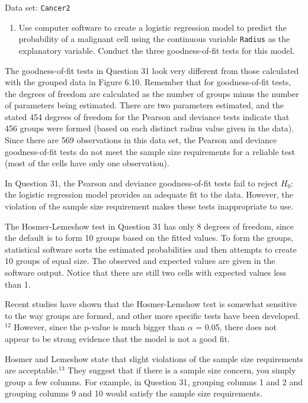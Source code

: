 \documentclass[
]{report}
\providecommand{\tightlist}{%
  \setlength{\itemsep}{0pt}\setlength{\parskip}{0pt}}
\begin{document}
Data set: \texttt{Cancer2}

\begin{enumerate}
\def\labelenumi{\arabic{enumi}.}
\setcounter{enumi}{30}
\tightlist
\item
  Use computer software to create a logistic regression model to predict the probability of a malignant cell using the continuous variable \texttt{Radius} as the explanatory variable. Conduct the three goodness-of-fit tests for this model.
\end{enumerate}

The goodness-of-fit tests in Question 31 look very different from those calculated with the grouped data in Figure 6.10. Remember that for goodness-of-fit tests, the degrees of freedom are calculated as the number of groups minus the number of parameters being estimated. There are two parameters estimated, and the stated 454 degrees of freedom for the Pearson and deviance tests indicate that 456 groups were formed (based on each distinct radius value given in the data). Since there are 569 observations in this data set, the Pearson and deviance goodness-of-fit tests do not meet the sample size requirements for a reliable test (most of the cells have only one observation).

In Question 31, the Pearson and deviance goodness-of-fit tests fail to reject \(\scriptstyle H_0\): the logistic regression model provides an adequate fit to the data. However, the violation of the sample size requirement makes these tests inappropriate to use.

The Hosmer-Lemeshow test in Question 31 has only 8 degrees of freedom, since the default is to form 10
groups based on the fitted values. To form the groups, statistical software sorts the estimated probabilities and then attempts to create 10 groups of equal size. The observed and expected values are given in the software output. Notice that there are still two cells with expected values less than 1.

Recent studies have shown that the Hosmer-Lemshow test is somewhat sensitive to the way groups are formed, and other more specific tests have been developed.\(^{12}\) However, since the p-value is much bigger than \(\scriptstyle \alpha\) = 0.05, there does not appear to be strong evidence that the model is not a good fit.

Hosmer and Lemeshow state that slight violations of the sample size requirements are acceptable.\(^{13}\) They suggest that if there is a sample size concern, you simply group a few columns. For example, in Question 31, grouping columns 1 and 2 and grouping columns 9 and 10 would satisfy the sample size requirements.
\end{document}
